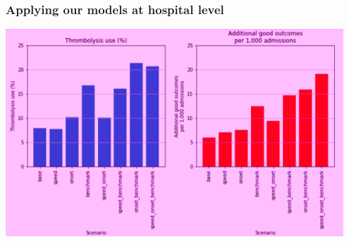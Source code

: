 \documentclass[xcolor={usenames,dvipsnames}]{beamer}
\begin{document}

\begin{frame}
\frametitle{Applying our models at hospital level}

\begin{center}
\includegraphics[width=0.95\textwidth]{./images_pink/hosp_scenario_1}
\end{center}

\end{frame}


\end{document}
